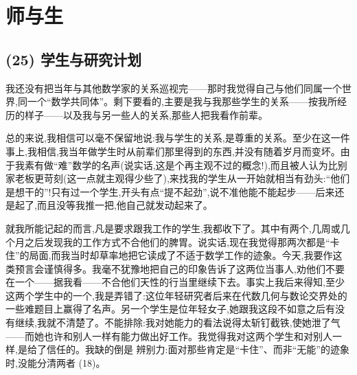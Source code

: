 \chapter{师与生}

\section{(25) 学生与研究计划}

我还没有把当年与其他数学家的关系巡视完——那时我觉得自己与他们同属一个世界,同一个“数学共同体”。剩下要看的,主要是我与我那些学生的关系——按我所经历的样子——以及我与另一些人的关系,那些人把我看作前辈。

总的来说,我相信可以毫不保留地说:我与学生的关系,是尊重的关系。至少在这一件事上,我相信,我当年做学生时从前辈们那里得到的东西,并没有随着岁月而变坏。由于我素有做“难”数学的名声(说实话,这是个再主观不过的概念!),而且被人认为比别家老板更苛刻(这一点就主观得少些了),来找我的学生从一开始就相当有劲头:“他们是想干的”!只有过一个学生,开头有点“提不起劲”,说不准他能不能起步——后来还是起了,而且没等我推一把,他自己就发动起来了。

就我所能记起的而言,凡是要求跟我工作的学生,我都收下了。其中有两个,几周或几个月之后发现我的工作方式不合他们的脾胃。说实话,现在我觉得那两次都是“卡住”的局面,而我当时却草率地把它读成了不适于数学工作的迹象。今天,我要作这类预言会谨慎得多。我毫不犹豫地把自己的印象告诉了这两位当事人,劝他们不要在一个——据我看——不合他们天性的行当里继续下去。事实上我后来得知,至少这两个学生中的一个,我是弄错了:这位年轻研究者后来在代数几何与数论交界处的一些难题目上赢得了名声。另一个学生是位年轻女子,她跟我这段不如意之后有没有继续,我就不清楚了。不能排除:我对她能力的看法说得太斩钉截铁,使她泄了气——而她也许和别人一样有能力做出好工作。我觉得我对这两个学生和对别人一样,是给了信任的。我缺的倒是%
辨别力:面对那些肯定是“卡住”、而非“无能”的迹象时,没能分清两者 (18)。

